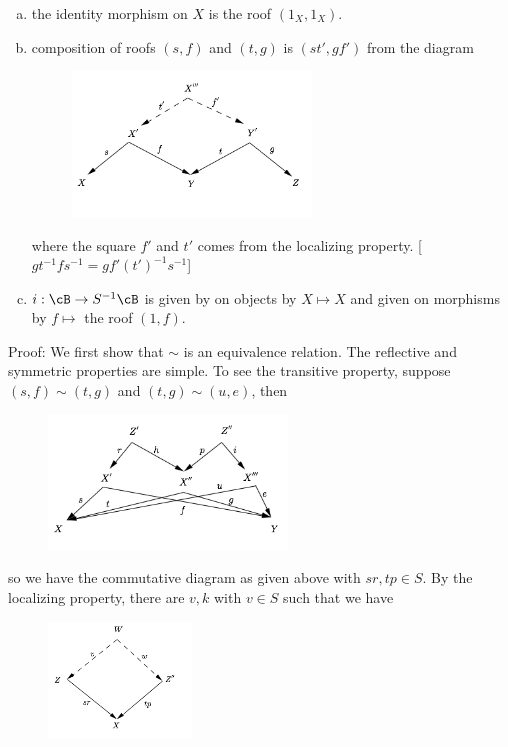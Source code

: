 \begin{prop}
\begin{enumerate}[(a)]
\item the identity morphism on $X$ is the roof $(1_X,1_X)$.

\item composition of roofs $(s,f)$ and $(t,g)$ is $(st',gf')$ from the diagram

\begin{figure}[H] 
   \centering
   \includegraphics[width=2.5in]{images/p5.png} 
\end{figure}

where the square $f'$ and $t'$ comes from the localizing property. [$gt^{-1}fs^{-1}=gf'(t')^{-1}s^{-1}$]


\item $i: \cB \to S^{-1}\cB$ is given by on objects by $X \mapsto X$ and given on morphisms by $f \mapsto $ the roof $(1,f)$. 

\end{enumerate}
\end{prop}

\noindent Proof: We first show that $\sim$ is an equivalence relation. The reflective and symmetric properties are simple. To see the transitive property, suppose $(s,f) \sim (t,g)$ and $(t,g) \sim (u,e)$, then

\begin{figure}[H] 
   \centering
   \includegraphics[width=2.5in]{images/p6.png} 
\end{figure}

so we have the commutative diagram as given above with $sr,tp \in S$. By the localizing property, there are $v,k$ with $v \in S$ such that we have

\begin{figure}[H] 
   \centering
   \includegraphics[width=1.5in]{images/p7.png} 
\end{figure}


